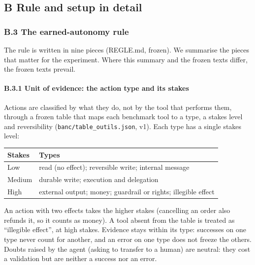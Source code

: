 \subsection{B Rule and setup in detail}\label{b-rule-and-setup-in-detail}

\subsubsection{B.3 The earned-autonomy rule}\label{b.3-the-earned-autonomy-rule}

The rule is written in nine pieces (REGLE.md, frozen). We summarise the pieces that matter for the experiment. Where this summary and the frozen texts differ, the frozen texts prevail.

\paragraph{B.3.1 Unit of evidence: the action type and its stakes}\label{b.3.1-unit-of-evidence-the-action-type-and-its-stakes}

Actions are classified by what they do, not by the tool that performs them, through a frozen table that maps each benchmark tool to a type, a stakes level and reversibility (\texttt{banc/\allowbreak{}table\_\allowbreak{}outils.\allowbreak{}json}, v1). Each type has a single stakes level:

{\def\LTcaptype{none} %
\begin{longtable}[]{@{}ll@{}}
\toprule\noalign{}
Stakes & Types \\
\midrule\noalign{}
\endhead
\bottomrule\noalign{}
\endlastfoot
Low & read (no effect); reversible write; internal message \\
Medium & durable write; execution and delegation \\
High & external output; money; guardrail or rights; illegible effect \\
\end{longtable}
}

An action with two effects takes the higher stakes (cancelling an order also refunds it, so it counts as money). A tool absent from the table is treated as ``illegible effect'', at high stakes. Evidence stays within its type: successes on one type never count for another, and an error on one type does not freeze the others. Doubts raised by the agent (asking to transfer to a human) are neutral: they cost a validation but are neither a success nor an error.

